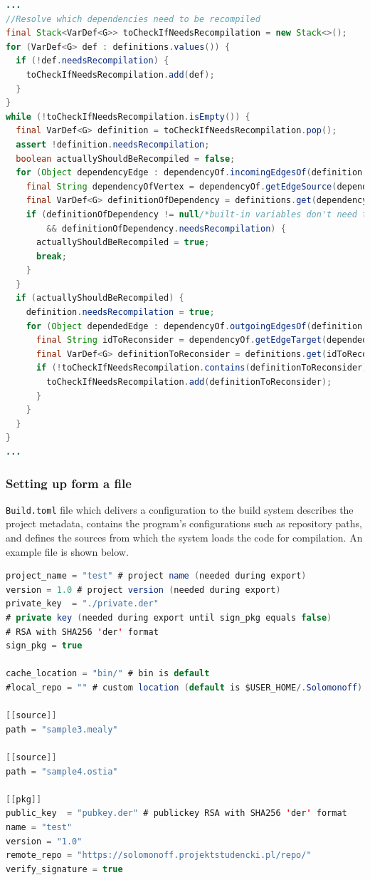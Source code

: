 \begin{lstlisting}[language=Java, frame=single]
...
//Resolve which dependencies need to be recompiled
final Stack<VarDef<G>> toCheckIfNeedsRecompilation = new Stack<>();
for (VarDef<G> def : definitions.values()) {
  if (!def.needsRecompilation) {
    toCheckIfNeedsRecompilation.add(def);
  }
}
while (!toCheckIfNeedsRecompilation.isEmpty()) {
  final VarDef<G> definition = toCheckIfNeedsRecompilation.pop();
  assert !definition.needsRecompilation;
  boolean actuallyShouldBeRecompiled = false;
  for (Object dependencyEdge : dependencyOf.incomingEdgesOf(definition.id)) {
    final String dependencyOfVertex = dependencyOf.getEdgeSource(dependencyEdge);
    final VarDef<G> definitionOfDependency = definitions.get(dependencyOfVertex);
    if (definitionOfDependency != null/*built-in variables don't need to recompiled*/
        && definitionOfDependency.needsRecompilation) {
      actuallyShouldBeRecompiled = true;
      break;
    }
  }
  if (actuallyShouldBeRecompiled) {
    definition.needsRecompilation = true;
    for (Object dependedEdge : dependencyOf.outgoingEdgesOf(definition.id)) {
      final String idToReconsider = dependencyOf.getEdgeTarget(dependedEdge);
      final VarDef<G> definitionToReconsider = definitions.get(idToReconsider);
      if (!toCheckIfNeedsRecompilation.contains(definitionToReconsider)) {
        toCheckIfNeedsRecompilation.add(definitionToReconsider);
      }
    }
  }
}
...
\end{lstlisting}

\hypertarget{setting-up-form-a-file}{%
\subsubsection{Setting up form a file}\label{setting-up-form-a-file}}

\texttt{Build.toml} file which delivers a configuration to the build system
describes the project metadata, contains the program's configurations
such as repository paths, and defines the sources from which the system
loads the code for compilation. An example file is shown below.

\begin{lstlisting}[language=Java, frame=single]
project_name = "test" # project name (needed during export)
version = 1.0 # project version (needed during export)
private_key  = "./private.der" 
# private key (needed during export until sign_pkg equals false) 
# RSA with SHA256 'der' format
sign_pkg = true

cache_location = "bin/" # bin is default 
#local_repo = "" # custom location (default is $USER_HOME/.Solomonoff)

[[source]]
path = "sample3.mealy"

[[source]]
path = "sample4.ostia"

[[pkg]]
public_key  = "pubkey.der" # publickey RSA with SHA256 'der' format
name = "test" 
version = "1.0"
remote_repo = "https://solomonoff.projektstudencki.pl/repo/"
verify_signature = true
\end{lstlisting}

